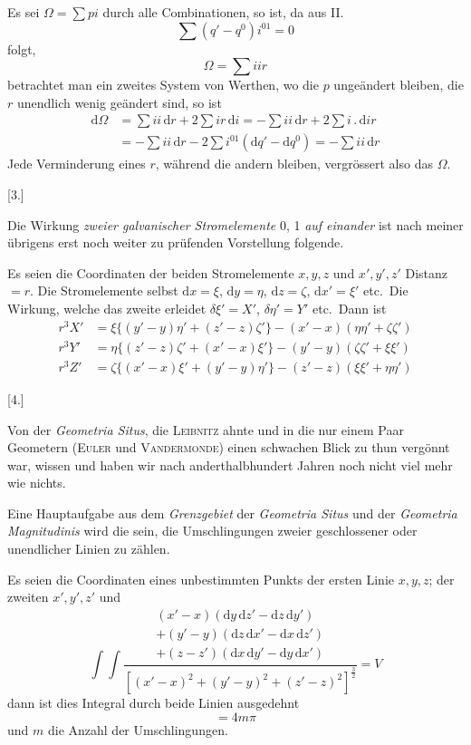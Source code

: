 Es sei $\Omega=\sum pi$ durch alle Combinationen, so ist, da aus II.
\[
\sum(q'-q^0)i^{01}=0
\]
folgt,
\[
\Omega=\sum iir
\]
betrachtet man ein zweites System von Werthen, wo die $p$ ungeändert bleiben, die $r$ unendlich wenig geändert sind, so ist
\[
\begin{aligned}
\mathrm d\Omega&=\sum ii\,\mathrm dr+2\sum ir\,\mathrm di=-\sum ii\,\mathrm dr+2\sum i\,.\,\mathrm dir\\
&=-\sum ii\,\mathrm dr-2\sum i^{01}(\mathrm dq'-\mathrm dq^0)=-\sum ii\,\mathrm dr
\end{aligned}
\]
Jede Verminderung eines $r$, während die andern bleiben, vergrössert also das $\Omega$.

\begin{center}[3.]\end{center}
Die Wirkung \textit{zweier galvanischer Stromelemente} 0, 1 \textit{auf einander} ist nach meiner übrigens erst noch weiter zu prüfenden Vorstellung folgende.

Es seien die Coordinaten der beiden Stromelemente $x,y,z$ und $x',y',z'$ Distanz $=r$. Die Stromelemente selbst $\mathrm dx=\xi$, $\mathrm dy=\eta$, $\mathrm dz=\zeta$, $\mathrm dx'=\xi'$ etc.\ Die Wirkung, welche das zweite erleidet $\delta\xi'=X'$, $\delta\eta'=Y'$ etc.\ Dann ist
\[
\begin{aligned}
r^3X'&=\xi\{(y'-y)\eta'+(z'-z)\zeta'\}-(x'-x)(\eta\eta'+\zeta\zeta')\\
r^3Y'&=\eta\{(z'-z)\zeta'+(x'-x)\xi'\}-(y'-y)(\zeta\zeta'+\xi\xi')\\
r^3Z'&=\zeta\{(x'-x)\xi'+(y'-y)\eta'\}-(z'-z)(\xi\xi'+\eta\eta')
\end{aligned}
\]

\begin{center}[4.]\end{center}
Von der \textit{Geometria Situs}, die \textsc{Leibnitz} ahnte und in die nur einem Paar Geometern (\textsc{Euler} und \textsc{Vandermonde}) einen schwachen Blick zu thun vergönnt war, wissen und haben wir nach anderthalbhundert Jahren noch nicht viel mehr wie nichts.

Eine Hauptaufgabe aus dem \textit{Grenzgebiet} der \textit{Geometria Situs} und der \textit{Geometria Magnitudinis} wird die sein, die Umschlingungen zweier geschlossener oder unendlicher Linien zu zählen.

Es seien die Coordinaten eines unbestimmten Punkts der ersten Linie $x,y,z$; der zweiten $x',y',z'$ und
\[
\int\int\frac{\begin{gathered}
(x'-x)(\mathrm dy\,\mathrm dz'-\mathrm dz\,\mathrm dy')\\
+(y'-y)(\mathrm dz\,\mathrm dx'-\mathrm dx\,\mathrm dz')\\
+(z-z')(\mathrm dx\,\mathrm dy'-\mathrm dy\,\mathrm dx')
\end{gathered}}{[(x'-x)^2+(y'-y)^2+(z'-z)^2]^{\frac{3}{2}}}=V
\]
dann ist dies Integral durch beide Linien ausgedehnt
\[
=4m\pi
\]
und $m$ die Anzahl der Umschlingungen.

